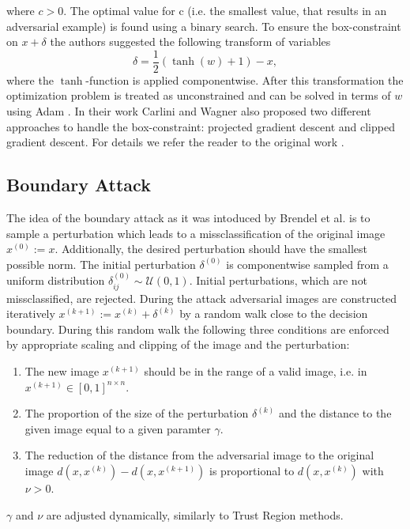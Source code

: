\documentclass{article}
\begin{document}
where $c>0$. The optimal value for c (i.e. the smallest value, that results in an adversarial example) is found using a binary search. To ensure the box-constraint on $x+\delta$ the authors suggested the following transform of variables 
\begin{equation}
	\delta = \frac{1}{2}(\tanh(w)+1)-x,
\end{equation} 
where the $\tanh$-function is applied componentwise. After this transformation the optimization problem is treated as unconstrained and can be solved in terms of $w$ using Adam \cite{adam}. In their work Carlini and Wagner also proposed two different approaches to handle the box-constraint: projected gradient descent and clipped gradient descent. For details we refer the reader to the original work \cite{carlini}.

\subsection{Boundary Attack}

The idea of the boundary attack as it was intoduced by Brendel et al. \cite{boundary} is to sample a perturbation which leads to a missclassification of the original image $x^{(0)}:=x$. Additionally, the desired perturbation should have the smallest possible norm. The initial perturbation $\delta^{(0)}$ is componentwise sampled from a uniform distribution $\delta^{(0)}_{ij}\sim \mathcal{U}(0,1)$. Initial perturbations, which are not missclassified, are rejected. During the attack adversarial images are constructed iteratively $x^{(k+1)}:= x^{(k)}+\delta^{(k)}$ by a random walk close to the decision boundary. During this random walk the following three conditions are enforced by appropriate scaling and clipping of the image and the perturbation:
\begin{enumerate}
	\item The new image $x^{(k+1)}$ should be in the range of a valid image, i.e. in $x^{(k+1)}\in [0,1]^{n\times n}$.
	\item The proportion of the size of the perturbation $\delta^{(k)}$ and the distance to the given image equal to a given paramter $\gamma$.
	\item The reduction of the distance from the adversarial image to the original image $d(x, x^{(k)})-d(x, x^{(k+1)})$ is proportional to $d(x, x^{(k)})$ with $\nu>0$.
\end{enumerate}
$\gamma$ and $\nu$ are adjusted dynamically, similarly to Trust Region methods.
\end{document}
